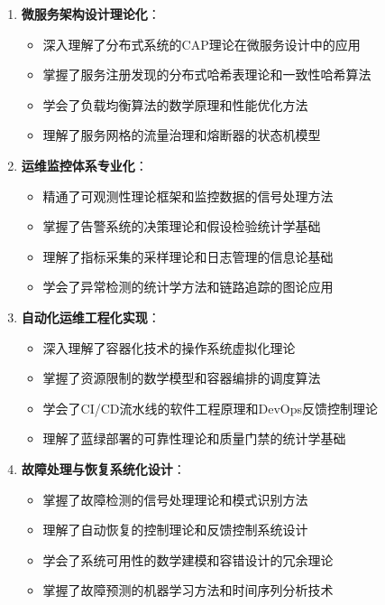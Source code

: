 \begin{enumerate}
\def\labelenumi{\arabic{enumi}.}
\tightlist
\item
  \textbf{微服务架构设计理论化}：

  \begin{itemize}
  \tightlist
  \item
    深入理解了分布式系统的CAP理论在微服务设计中的应用
  \item
    掌握了服务注册发现的分布式哈希表理论和一致性哈希算法
  \item
    学会了负载均衡算法的数学原理和性能优化方法
  \item
    理解了服务网格的流量治理和熔断器的状态机模型
  \end{itemize}
\item
  \textbf{运维监控体系专业化}：

  \begin{itemize}
  \tightlist
  \item
    精通了可观测性理论框架和监控数据的信号处理方法
  \item
    掌握了告警系统的决策理论和假设检验统计学基础
  \item
    理解了指标采集的采样理论和日志管理的信息论基础
  \item
    学会了异常检测的统计学方法和链路追踪的图论应用
  \end{itemize}
\item
  \textbf{自动化运维工程化实现}：

  \begin{itemize}
  \tightlist
  \item
    深入理解了容器化技术的操作系统虚拟化理论
  \item
    掌握了资源限制的数学模型和容器编排的调度算法
  \item
    学会了CI/CD流水线的软件工程原理和DevOps反馈控制理论
  \item
    理解了蓝绿部署的可靠性理论和质量门禁的统计学基础
  \end{itemize}
\item
  \textbf{故障处理与恢复系统化设计}：

  \begin{itemize}
  \tightlist
  \item
    掌握了故障检测的信号处理理论和模式识别方法
  \item
    理解了自动恢复的控制理论和反馈控制系统设计
  \item
    学会了系统可用性的数学建模和容错设计的冗余理论
  \item
    掌握了故障预测的机器学习方法和时间序列分析技术
  \end{itemize}
\end{enumerate}

